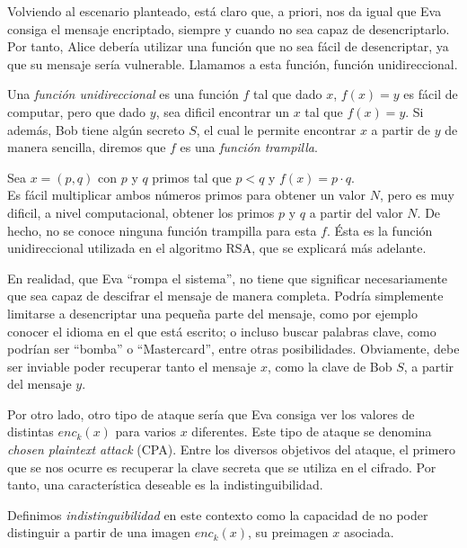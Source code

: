     Volviendo al escenario planteado, está claro que, a priori, nos da igual que Eva consiga el mensaje encriptado, siempre y cuando no sea capaz de desencriptarlo. Por tanto, Alice debería utilizar una función que no sea fácil de desencriptar, ya que su mensaje sería vulnerable. Llamamos a esta función, función unidireccional.
    
    \begin{definicion} \cite{cryptoSchool} 
        Una \textit{función unidireccional} es una función $f$ tal que dado $x$, $f(x) = y$ es fácil de computar, pero que dado $y$, sea dificil encontrar un $x$ tal que $f(x) = y$. Si además, Bob tiene algún secreto $S$, el cual le permite encontrar $x$ a partir de $y$ de manera sencilla, diremos que $f$ es una \textit{función trampilla}.
    \end{definicion}

    \begin{ejemplo} \cite{cryptoSchool}
        Sea $x = (p,q)$ con $p$ y $q$ primos tal que $p < q$ y $f(x) = p \cdot q$. \\
        Es fácil multiplicar ambos números primos para obtener un valor $N$, pero es muy dificil, a nivel computacional, obtener los primos $p$ y $q$ a partir del valor $N$. De hecho, no se conoce ninguna función trampilla para esta $f$. Ésta es la función unidireccional utilizada en el algoritmo RSA, que se explicará más adelante.
    \end{ejemplo}

    En realidad, que Eva ``rompa el sistema'', no tiene que significar necesariamente que sea capaz de descifrar el mensaje de manera completa. Podría simplemente limitarse a desencriptar una pequeña parte del mensaje, como por ejemplo conocer el idioma en el que está escrito; o incluso buscar palabras clave, como podrían ser ``bomba'' o ``Mastercard'', entre otras posibilidades. Obviamente, debe ser inviable poder recuperar tanto el mensaje $x$, como la clave de Bob $S$, a partir del mensaje $y$. 
    
    Por otro lado, otro tipo de ataque sería que Eva consiga ver los valores de distintas $enc_{k}(x)$ para varios $x$ diferentes. Este tipo de ataque se denomina \textit{chosen plaintext attack} (CPA). Entre los diversos objetivos del ataque, el primero que se nos ocurre es recuperar la clave secreta que se utiliza en el cifrado. Por tanto, una característica deseable es la indistinguibilidad.

    \begin{definicion} \cite{cryptoSchool}
        Definimos \textit{indistinguibilidad} en este contexto como la capacidad de no poder distinguir a partir de una imagen $enc_{k}(x)$, su preimagen $x$ asociada. 
    \end{definicion}
    
